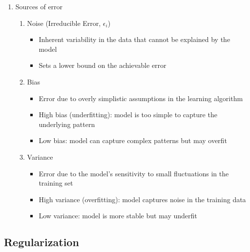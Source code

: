 \documentclass{article}
\begin{document}
\begin{enumerate}
    \item Sources of error
    \begin{enumerate}
        \item Noise (Irreducible Error, $\epsilon_i$)
            \begin{itemize}
                \item Inherent variability in the data that cannot be explained by the model
                \item Sets a lower bound on the achievable error
            \end{itemize}
        \item Bias
            \begin{itemize}
                \item Error due to overly simplistic assumptions in the learning algorithm
                \item High bias (underfitting): model is too simple to capture the underlying pattern
                \item Low bias: model can capture complex patterns but may overfit
            \end{itemize}
        \item Variance
            \begin{itemize}
                \item Error due to the model's sensitivity to small fluctuations in the training set
                \item High variance (overfitting): model captures noise in the training data
                \item Low variance: model is more stable but may underfit
            \end{itemize}
    \end{enumerate}
\end{enumerate}

\subsection{Regularization}
\end{document}
